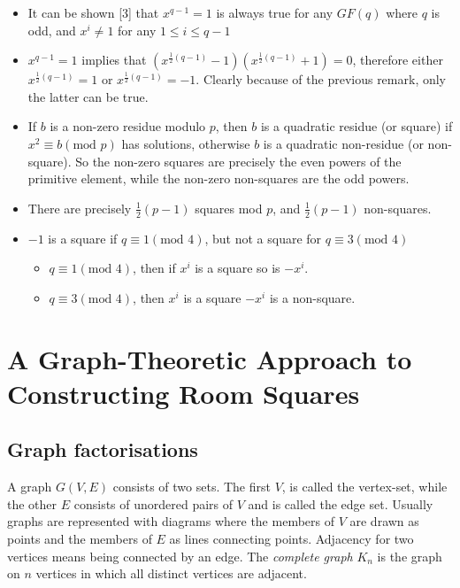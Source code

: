 \documentclass[
  12pt,
  a4paper]{book}
\begin{document}
\begin{itemize}
\item
  It can be shown {[}3{]} that \(x^{q-1}=1\) is always true for any \(GF(q)\)
  where \(q\) is odd, and \(x^i \neq 1\) for any \(1 \leq i \leq q-1\)
\item
  \(x^{q-1}=1\) implies that
  \((x^{\frac{1}{2}(q-1)}-1)(x^{\frac{1}{2}(q-1)}+1)=0\), therefore
  either \(x^{\frac{1}{2}(q-1)}=1\) or \(x^{\frac{1}{2}(q-1)}=-1\).
  Clearly because of the previous remark, only the latter can be true.
\item
  If \(b\) is a non-zero residue modulo \(p\), then \(b\) is a quadratic
  residue (or square) if \(x^2 \equiv b(\textrm{mod } p)\) has
  solutions, otherwise \(b\) is a quadratic non-residue (or non-square).
  So the non-zero squares are precisely the even powers of the
  primitive element, while the non-zero non-squares are the odd
  powers.
\item
  There are precisely \(\frac{1}{2}(p-1)\) squares mod \(p\), and
  \(\frac{1}{2}(p-1)\) non-squares.
\item
  \(-1\) is a square if \(q \equiv 1(\textrm{mod } 4)\), but not a square
  for \(q \equiv 3(\textrm{mod } 4)\)

  \begin{itemize}
  \item
    \(q \equiv 1(\textrm{mod } 4)\), then if \(x^i\) is a square so is
    \(-x^i\).
  \item
    \(q \equiv 3(\textrm{mod } 4)\), then \(x^i\) is a square \(-x^i\) is
    a non-square.
  \end{itemize}
\end{itemize}

\hypertarget{a-graph-theoretic-approach-to-constructing-room-squares}{%
\chapter{A Graph-Theoretic Approach to Constructing Room Squares}\label{a-graph-theoretic-approach-to-constructing-room-squares}}

\hypertarget{graph-factorisations}{%
\section{Graph factorisations}\label{graph-factorisations}}

A graph \(G(V,E)\) consists of two sets. The first \(V\), is called the
vertex-set, while the other \(E\) consists of unordered pairs of \(V\) and
is called the edge set. Usually graphs are represented with diagrams
where the members of \(V\) are drawn as points and the members of \(E\) as
lines connecting points. Adjacency for two vertices means being
connected by an edge. The \emph{complete graph} \(K_n\) is the graph on \(n\)
vertices in which all distinct vertices are adjacent.
\end{document}
